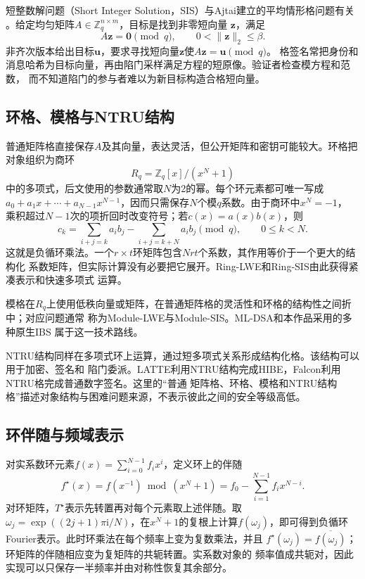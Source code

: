短整数解问题（Short Integer Solution，SIS）与Ajtai建立的平均情形格问题有关
\cite{ajtai1996}。给定均匀矩阵$A\in\mathbb Z_q^{n\times m}$，目标是找到非零短向量
$\mathbf z$，满足
\[
 A\mathbf z=\mathbf0\pmod q,
 \qquad 0<\lVert\mathbf z\rVert_2\leq\beta.
\]
非齐次版本给出目标$\mathbf u$，要求寻找短向量$\mathbf z$使$A\mathbf z=\mathbf u\pmod q$。
格签名常把身份和消息哈希为目标向量，再由陷门采样满足方程的短原像。验证者检查模方程和范数，
而不知道陷门的参与者难以为新目标构造合格短向量。

\subsection{环格、模格与NTRU结构}

普通矩阵格直接保存$A$及其向量，表达灵活，但公开矩阵和密钥可能较大。环格把对象组织为商环
\[
 R_q=\mathbb Z_q[x]/(x^N+1)
\]
中的多项式，后文使用的参数通常取$N$为2的幂。每个环元素都可唯一写成
$a_0+a_1x+\cdots+a_{N-1}x^{N-1}$，因而只需保存$N$个模$q$系数。由于商环中$x^N=-1$，
乘积超过$N-1$次的项折回时改变符号；若$c(x)=a(x)b(x)$，则
\[
 c_k=\sum_{i+j=k}a_i b_j-\sum_{i+j=k+N}a_i b_j\pmod q,
 \qquad 0\leq k<N.
\]
这就是负循环乘法。一个$r\times t$环矩阵包含$Nrt$个系数，其作用等价于一个更大的结构化
系数矩阵，但实际计算没有必要把它展开。Ring-LWE和Ring-SIS由此获得紧凑表示和快速多项式
运算\cite{lpr2013ring}。

模格在$R_q$上使用低秩向量或矩阵，在普通矩阵格的灵活性和环格的结构性之间折中；对应问题通常
称为Module-LWE与Module-SIS\cite{langlois2015module}。ML-DSA和本作品采用的多种原生IBS
属于这一技术路线。

NTRU结构同样在多项式环上运算，通过短多项式关系形成结构化格。该结构可以用于加密、签名和
陷门委派。LATTE利用NTRU结构完成HIBE，Falcon利用NTRU格完成普通数字签名。这里的“普通
矩阵格、环格、模格和NTRU结构格”描述对象结构与困难问题来源，不表示彼此之间的安全等级高低。

\subsection{环伴随与频域表示}

对实系数环元素$f(x)=\sum_{i=0}^{N-1}f_i x^i$，定义环上的伴随
\[
 f^\star(x)=f(x^{-1})\bmod(x^N+1)
 =f_0-\sum_{i=1}^{N-1}f_i x^{N-i}.
\]
对环矩阵，$T^\star$表示先转置再对每个元素取上述伴随。取
$\omega_j=\exp((2j+1)\pi\mathrm i/N)$，在$x^N+1$的复根上计算$f(\omega_j)$，即可得到负循环
Fourier表示。此时环乘法在每个频率上变为复数乘法，并且
$f^\star(\omega_j)=\overline{f(\omega_j)}$；环矩阵的伴随相应变为复矩阵的共轭转置。实系数对象的
频率值成共轭对，因此实现可以只保存一半频率并由对称性恢复其余部分。

